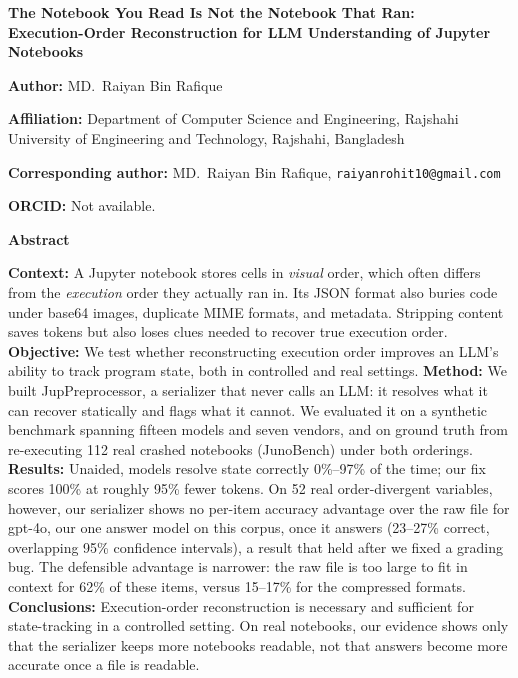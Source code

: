 \documentclass[11pt]{article}
\begin{document}
\begin{center}
{\LARGE\bfseries The Notebook You Read Is Not the Notebook That Ran:\\[4pt]
Execution-Order Reconstruction for LLM Understanding of Jupyter Notebooks}
\end{center}

\vspace{1em}

\noindent\textbf{Author:} MD.\ Raiyan Bin Rafique

\noindent\textbf{Affiliation:} Department of Computer Science and Engineering,
Rajshahi University of Engineering and Technology, Rajshahi, Bangladesh

\noindent\textbf{Corresponding author:} MD.\ Raiyan Bin Rafique,
\texttt{raiyanrohit10@gmail.com}

\noindent\textbf{ORCID:} Not available.

\vspace{1.5em}
\noindent\textbf{Abstract}

\noindent\textbf{Context:} A Jupyter notebook stores cells in \emph{visual}
order, which often differs from the \emph{execution} order they actually
ran in. Its JSON format also buries code under base64 images, duplicate
MIME formats, and metadata. Stripping content saves tokens but also loses
clues needed to recover true execution order.
\textbf{Objective:} We test whether reconstructing execution order
improves an LLM's ability to track program state, both in controlled and
real settings.
\textbf{Method:} We built JupPreprocessor, a serializer that never calls
an LLM: it resolves what it can recover statically and flags what it
cannot. We evaluated it on a synthetic benchmark spanning fifteen models
and seven vendors, and on ground truth from re-executing 112 real
crashed notebooks (JunoBench) under both orderings.
\textbf{Results:} Unaided, models resolve state correctly 0\%--97\% of the
time; our fix scores 100\% at roughly 95\% fewer tokens.
On 52 real order-divergent variables, however, our serializer shows no
per-item accuracy advantage over the raw file for gpt-4o, our one answer
model on this corpus, once it answers (23--27\% correct, overlapping
95\% confidence intervals), a result that held after we fixed a grading
bug. The defensible advantage is narrower: the raw file is too large to fit
in context for 62\% of these items, versus 15--17\% for the compressed
formats.
\textbf{Conclusions:} Execution-order reconstruction is necessary and
sufficient for state-tracking in a controlled setting. On real notebooks,
our evidence shows only that the serializer keeps more notebooks
readable, not that answers become more accurate once a file is readable.
\end{document}
